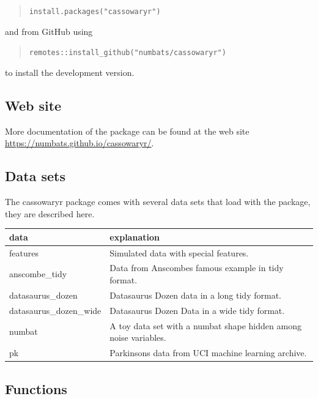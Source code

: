 \begin{quote}
\texttt{install.packages("cassowaryr")}
\end{quote}

and from GitHub using

\begin{quote}
\texttt{remotes::install\_github("numbats/cassowaryr")}
\end{quote}

to install the development version.

\hypertarget{web-site}{%
\subsection{Web site}\label{web-site}}

More documentation of the package can be found at the web site
\url{https://numbats.github.io/cassowaryr/}.

\hypertarget{data-sets}{%
\subsection{Data sets}\label{data-sets}}

The cassowaryr package comes with several data sets that load with the
package, they are described here.

\begin{Schunk}

\begin{tabular}{l|l}
\hline
data & explanation\\
\hline
features & Simulated data with special features.\\
\hline
anscombe\_tidy & Data from Anscombes famous example in tidy format.\\
\hline
datasaurus\_dozen & Datasaurus Dozen data in a long tidy format.\\
\hline
datasaurus\_dozen\_wide & Datasaurus Dozen Data in a wide tidy format.\\
\hline
numbat & A toy data set with a numbat shape hidden among noise variables.\\
\hline
pk & Parkinsons data from UCI machine learning archive.\\
\hline
\end{tabular}

\end{Schunk}

\hypertarget{functions}{%
\subsection{Functions}\label{functions}}

